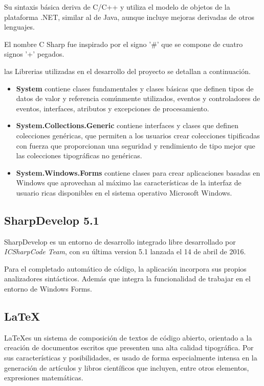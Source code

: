 \documentclass[12pt]{article}
\begin{document}
Su sintaxis básica deriva de C/C++ y utiliza el modelo de objetos de la plataforma .NET, similar al de Java, aunque incluye mejoras derivadas de otros lenguajes.

El nombre C Sharp fue inspirado por el signo '\#' que se compone de cuatro signos '+' pegados.  

las Librerias utilizadas en el desarrollo del proyecto se detallan a continuación.  

\begin{itemize}
\item \textbf{System} contiene clases fundamentales y clases básicas que definen tipos de datos de valor y referencia comúnmente utilizados, eventos y controladores de eventos, interfaces, atributos y excepciones de procesamiento.
\item \textbf{System.Collections.Generic} contiene interfaces y clases que definen colecciones genéricas, que permiten a los usuarios crear colecciones tipificadas con fuerza que proporcionan una seguridad y rendimiento de tipo mejor que las colecciones tipográficas no genéricas.
\item \textbf{System.Windows.Forms} contiene clases para crear aplicaciones basadas en Windows que aprovechan al máximo las características de la interfaz de usuario ricas disponibles en el sistema operativo Microsoft Windows.
\end{itemize}
\subsection{SharpDevelop 5.1}

SharpDevelop es un entorno de desarrollo integrado libre desarrollado por \textit{ICSharpCode Team}, con su última version 5.1 lanzada el 14 de abril de 2016. 

Para el completado automático de código, la aplicación incorpora sus propios analizadores sintácticos.  Además que integra la funcionalidad de trabajar en el entorno de Windows Forms. 

\subsection{\LaTeX}

\LaTeX es un sistema de composición de textos de código abierto, orientado a la creación de documentos escritos que presenten una alta calidad tipográfica. Por sus características y posibilidades, es usado de forma especialmente intensa en la generación de artículos y libros científicos que incluyen, entre otros elementos, expresiones matemáticas. 
\end{document}
